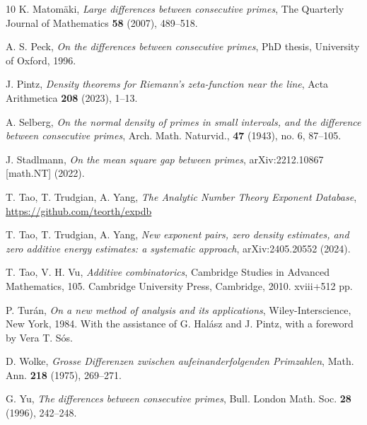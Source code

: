 \documentclass[12pt]{amsart}
\begin{document}
\begin{thebibliography}{10}
K. Matom\"aki, \emph{Large differences between consecutive primes}, The Quarterly Journal of Mathematics \textbf{58} (2007), 489--518.

A. S. Peck, \emph{On the differences between consecutive primes}, PhD thesis, University of Oxford, 1996.

J. Pintz, \emph{Density theorems for Riemann’s zeta-function near the line}, Acta Arithmetica \textbf{208} (2023), 1--13.

A. Selberg, \emph{On the normal density of primes in small intervals, and the difference between consecutive primes}, Arch. Math. Naturvid., \textbf{47} (1943), no. 6, 87--105.

J. Stadlmann, \emph{On the mean square gap between primes}, arXiv:2212.10867 [math.NT] (2022).

T. Tao, T. Trudgian, A. Yang, \emph{The Analytic Number Theory Exponent Database}, \url{https://github.com/teorth/expdb}

T. Tao, T. Trudgian, A. Yang, \emph{New exponent pairs, zero density estimates, and zero additive energy estimates: a systematic approach}, arXiv:2405.20552 (2024).

T. Tao, V. H. Vu, \emph{Additive combinatorics}, Cambridge Studies in Advanced Mathematics, 105. Cambridge University Press, Cambridge, 2010. xviii+512 pp.


P. Tur\'an, \emph{On a new method of analysis and its applications}, Wiley-Interscience, New York, 1984. With the assistance of G. Hal\'asz and J. Pintz, with a foreword by Vera T. S\'os.

D. Wolke, \emph{Grosse Differenzen zwischen aufeinanderfolgenden Primzahlen}, Math. Ann. \textbf{218} (1975), 269--271.

G. Yu, \emph{The differences between consecutive primes}, Bull. London Math. Soc. \textbf{28} (1996), 242--248.

\end{thebibliography}
\end{document}
